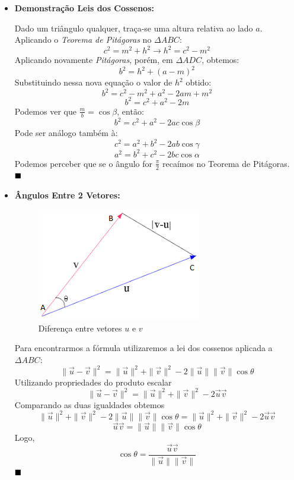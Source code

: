 \documentclass[a4paper,12pt]{article}
\begin{document}
	\begin{itemize}
		\item \textbf{Demonstração Leis dos Cossenos:}
		
		Dado um triângulo qualquer, traça-se uma altura relativa ao lado $a$. Aplicando o \textit{Teorema de Pitágoras} no $\Delta ABC$:
		$$
		c^{2}=m^{2}+h^{2} \rightarrow h^{2}=c^{2}-m^{2}
		$$
		Aplicando novamente \textit{Pitágoras}, porém, em $\Delta ADC$, obtemos:
		$$
		b^{2}=h^{2}+(a-m)^{2}
		$$
		Substituindo nessa nova equação o valor de $h^{2}$ obtido:
		$$
		b^{2}=c^{2}-m^{2}+a^{2}-2am+m^{2}
		$$
		$$
		b^{2}=c^{2}+a^{2}-2m
		$$
		Podemos ver que $\frac{m}{b}=\cos\beta$, então:
		$$
		b^{2}=c^{2}+a^{2}-2ac\cos\beta
		$$
		Pode ser análogo também à:
		$$
		c^{2}=a^{2}+b^{2}-2ab\cos\gamma
		$$
		$$
		a^{2}=b^{2}+c^{2}-2bc\cos\alpha
		$$
		Podemos perceber que se o ângulo for $\frac{\pi}{2}$ recaímos no Teorema de Pitágoras. $\hfill\blacksquare$
		\item \textbf{Ângulos Entre 2 Vetores:}
		\begin{figure}[H]
			\begin{center}
				\includegraphics{Angulovetoresnovo.png}
			\end{center}
			\caption{Diferença entre vetores $u$ e $v$}
			\label{}
		\end{figure}
		Para encontrarmos a fórmula utilizaremos a lei dos cossenos aplicada a $\Delta ABC$:
		$$
		\|\overrightarrow{u}-\overrightarrow{v}\|^{2}=\|\overrightarrow{u}\|^{2} + \|\overrightarrow{v}\|^{2} - 2\|\overrightarrow{u}\|\|\overrightarrow{v}\|\cos\theta
		$$
		Utilizando propriedades do produto escalar
		$$
		\|\overrightarrow{u}-\overrightarrow{v}\|^{2}=\|\overrightarrow{u}\|^{2} + \|\overrightarrow{v}\|^{2} - 2\overrightarrow{u}\overrightarrow{v}
		$$
		Comparando as duas igualdades obtemos
		$$
		\|\overrightarrow{u}\|^{2} + \|\overrightarrow{v}\|^{2} - 2\|\overrightarrow{u}\|\|\overrightarrow{v}\|\cos\theta = \|\overrightarrow{u}\|^{2} + \|\overrightarrow{v}\|^{2} - 2\overrightarrow{u}\overrightarrow{v}
		$$
		$$
		\overrightarrow{u}\overrightarrow{v} = \|\overrightarrow{u}\|\|\overrightarrow{v}\|\cos\theta
		$$
		Logo,
		$$
		\cos\theta = \frac{\overrightarrow{u}\overrightarrow{v}}{\|\overrightarrow{u}\|\|\overrightarrow{v}\|} 
		$$
		$\hfill\blacksquare$
	\end{itemize}
	
	
\end{document}
